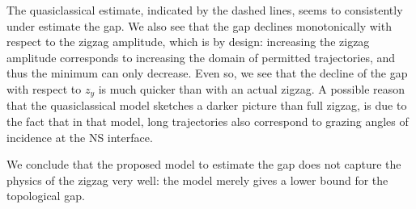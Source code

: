 			The quasiclassical estimate, indicated by the dashed lines, seems to consistently under estimate the gap.
			We also see that the gap declines monotonically with respect to the zigzag amplitude, which is by design: increasing the zigzag amplitude corresponds to increasing the domain of permitted trajectories, and thus the minimum can only decrease.
			Even so, we see that the decline of the gap with respect to $z_y$ is much quicker than with an actual zigzag.
			A possible reason that the quasiclassical model sketches a darker picture than full zigzag, is due to the fact that in that model, long trajectories also correspond to grazing angles of incidence at the NS interface.

			We conclude that the proposed model to estimate the gap does not capture the physics of the zigzag very well: the model merely gives a lower bound for the topological gap.
			